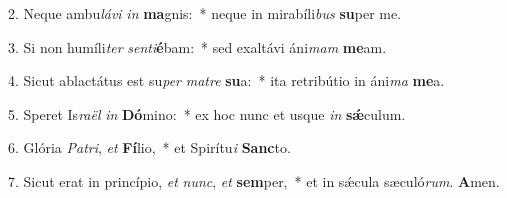 2. Neque ambu\textit{lá}\textit{vi} \textit{in} \textbf{ma}gnis:~*  neque in mirabíli\textit{bus} \textbf{su}per me.\

3. Si non humíli\textit{ter} \textit{sen}\textit{ti}\textbf{é}bam:~*  sed exaltávi áni\textit{mam} \textbf{me}am.\

4. Sicut ablactátus est su\textit{per} \textit{ma}\textit{tre} \textbf{su}a:~*  ita retribútio in áni\textit{ma} \textbf{me}a.\

5. Speret Is\textit{ra}\textit{ël} \textit{in} \textbf{Dó}mino:~*  ex hoc nunc et usque \textit{in} \textbf{sǽ}culum.\

6. Glória \textit{Pa}\textit{tri}, \textit{et} \textbf{Fí}lio,~*  et Spirítu\textit{i} \textbf{Sanc}to.\

7. Sicut erat in princípio, \textit{et} \textit{nunc}, \textit{et} \textbf{sem}per,~*  et in sǽcula sæculó\textit{rum}. \textbf{A}men.\

